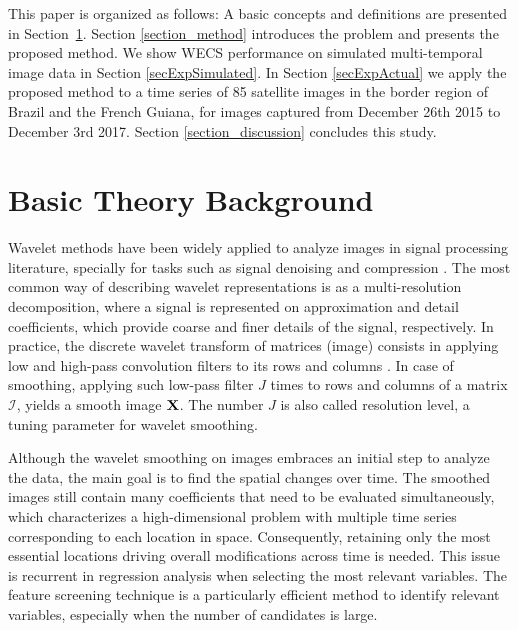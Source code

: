 \documentclass[journal]{IEEEtran}
\newcommand{\vX}{{\textbf X}}
\begin{document}
This paper is organized as follows:
A basic concepts and definitions are presented in Section~\ref{section_theroy}.
Section \ref{section_method} introduces the problem and presents the proposed method. We show WECS performance on simulated multi-temporal image data in Section \ref{secExpSimulated}. In Section \ref{secExpActual} we apply the proposed method to a time series of 85 satellite images in the border region of Brazil and the French Guiana, for  images captured from December 26th 2015 to December 3rd 2017.  Section \ref{section_discussion} concludes this study.%


\section{Basic Theory Background}\label{section_theroy}

Wavelet methods have been widely applied to analyze images in signal processing literature, specially for tasks such as signal denoising and compression \cite{mallat1998wavelet}. The most common way of describing wavelet representations is as a multi-resolution decomposition, where a signal is represented on approximation and detail coefficients, which provide coarse and finer details of the signal, respectively. In practice, the discrete wavelet transform of matrices (image) consists in applying low and high-pass convolution filters to its rows and columns \cite{mallat1989theory}. In case of smoothing, applying such low-pass filter $J$ times to rows and columns of a matrix $\mathcal{I}$, yields a smooth image $\vX$. The number $J$ is also called resolution level, a tuning parameter for wavelet smoothing. %

Although the wavelet smoothing on images embraces an initial step to analyze the data, the main goal is to find the spatial changes over time. 
The smoothed images still contain many coefficients that need to be evaluated simultaneously, which characterizes a high-dimensional problem with multiple time series corresponding to each location in space. 
Consequently, retaining only the most essential locations driving overall modifications across time is needed. 
This issue is recurrent in regression analysis when selecting the most relevant variables.
The feature screening technique is a particularly efficient method to identify relevant variables, especially when the number of candidates is large.
\end{document}
